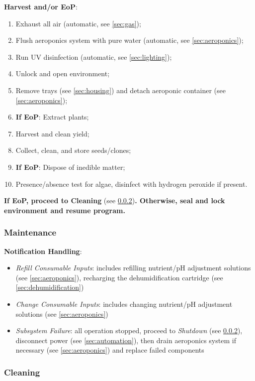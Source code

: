\clearpage

\textbf{Harvest and/or EoP}:
\begin{enumerate}
    \item Exhaust all air (automatic, see \ref{sec:gas});
    \item Flush aeroponics system with pure water (automatic, see \ref{sec:aeroponics});
    \item Run UV disinfection (automatic, see \ref{sec:lighting});
    \item Unlock and open environment;
    \item Remove trays (see \ref{sec:housing}) and detach aeroponic container (see \ref{sec:aeroponics});
    \item \textbf{If EoP}: Extract plants;
    \item Harvest and clean yield;
    \item Collect, clean, and store seeds/clones;
    \item \textbf{If EoP}: Dispose of inedible matter;
    \item Presence/absence test for algae, disinfect with hydrogen peroxide if present.
\end{enumerate}

\textbf{If EoP, proceed to Cleaning} (see \ref{sec:process_cleaning})\textbf{. Otherwise, seal and lock environment and resume program.}

\subsubsection{Maintenance}
\label{sec:process_maintenance}

\textbf{Notification Handling}:
\begin{itemize}
    \item \textit{Refill Consumable Inputs}: includes refilling nutrient/pH adjustment solutions (see \ref{sec:aeroponics}), recharging the dehumidification cartridge (see \ref{sec:dehumidification})
    \item \textit{Change Consumable Inputs}: includes changing nutrient/pH adjustment solutions (see \ref{sec:aeroponics})
    \item \textit{Subsystem Failure}: all operation stopped, proceed to \textit{Shutdown} (see \ref{sec:process_cleaning}), disconnect power (see \ref{sec:automation}), then drain aeroponics system if necessary (see \ref{sec:aeroponics}) and replace failed components
\end{itemize}

\subsubsection{Cleaning}
\label{sec:process_cleaning}


